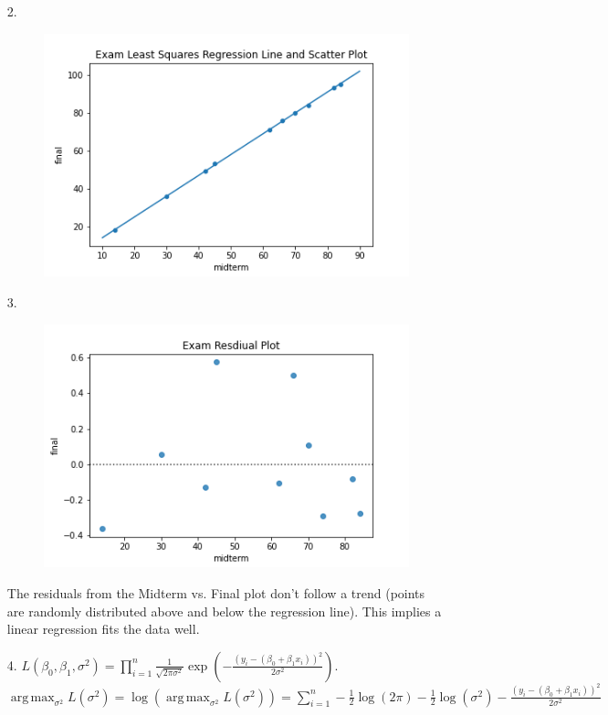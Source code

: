 \documentclass[10pt]{article}
\DeclareMathOperator*{\argmax}{arg\,max}
\begin{document}
\begin{enumerate}[label=\textbf{Problem \arabic*.}]
\begin{itemize}
        \item [2.] \begin{figure}[h!]
            \centering
            \includegraphics[scale=0.5]{Exam Least Squares Regression Line and Scatter Plot.png}
        \end{figure}
        \item [3.] \begin{figure}[h!]
            \centering
            \includegraphics[scale=0.5]{Exam Resdiual Plot.png}
        \end{figure}
        The residuals from the Midterm vs. Final plot don't follow a trend (points are randomly distributed above and below the regression line). This implies a linear regression fits the data well.
        \item [4.] $\displaystyle L(\beta_0,\beta_1,\sigma^2)=\prod_{i=1}^{n}\frac{1}{\sqrt{2\pi\sigma^2}}\exp(-\frac{{(y_i-(\beta_0+\beta_1x_i))}^2}{2\sigma^2})$.
        $\displaystyle\argmax_{\sigma^2}L(\sigma^2)=\log(\argmax_{\sigma^2}L(\sigma^2))=\sum_{i=1}^{n}-\frac{1}{2}\log(2\pi)-\frac{1}{2}\log(\sigma^2)-\frac{{(y_i-(\beta_0+\beta_1x_i))}^2}{2\sigma^2}$

\end{itemize}
\end{enumerate}
\end{document}
